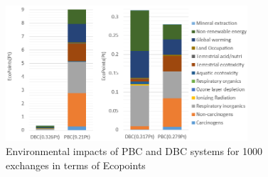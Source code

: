 \documentclass[conference]{IEEEtran}
\begin{document}
\begin{figure}[h]
\centering
\includegraphics[width=9cm]{lasttt.PNG}
\caption{Environmental impacts of PBC and DBC systems for 1000 exchanges in terms of Ecopoints}
\label{fig:onescore}
\end{figure}

\end{document}
